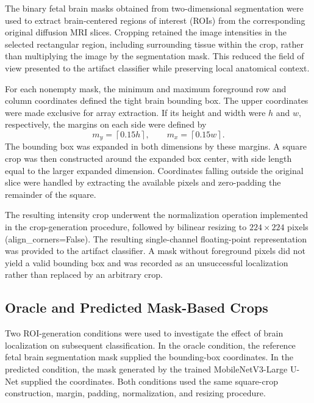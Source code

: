 \label{subsubsec:roi-cropping}

The binary fetal brain masks obtained from two-dimensional segmentation were used to extract brain-centered regions of interest (ROIs) from the corresponding original diffusion MRI slices. Cropping retained the image intensities in the selected rectangular region, including surrounding tissue within the crop, rather than multiplying the image by the segmentation mask. This reduced the field of view presented to the artifact classifier while preserving local anatomical context.

For each nonempty mask, the minimum and maximum foreground row and column coordinates defined the tight brain bounding box. The upper coordinates were made exclusive for array extraction. If its height and width were $h$ and $w$, respectively, the margins on each side were defined by
\begin{equation}
m_y=\left\lceil0.15h\right\rceil,\qquad
m_x=\left\lceil0.15w\right\rceil.
\end{equation}
The bounding box was expanded in both dimensions by these margins. A square crop was then constructed around the expanded box center, with side length equal to the larger expanded dimension. Coordinates falling outside the original slice were handled by extracting the available pixels and zero-padding the remainder of the square.

The resulting intensity crop underwent the normalization operation implemented in the crop-generation procedure, followed by bilinear resizing to $224\times224$ pixels (align\_corners=False). The resulting single-channel floating-point representation was provided to the artifact classifier. A mask without foreground pixels did not yield a valid bounding box and was recorded as an unsuccessful localization rather than replaced by an arbitrary crop.

\subsection{Oracle and Predicted Mask-Based Crops}
\label{subsec:2d_oracle_predicted_crops}

Two ROI-generation conditions were used to investigate the effect of brain localization on subsequent classification. In the oracle condition, the reference fetal brain segmentation mask supplied the bounding-box coordinates. In the predicted condition, the mask generated by the trained MobileNetV3-Large U-Net supplied the coordinates. Both conditions used the same square-crop construction, margin, padding, normalization, and resizing procedure.

